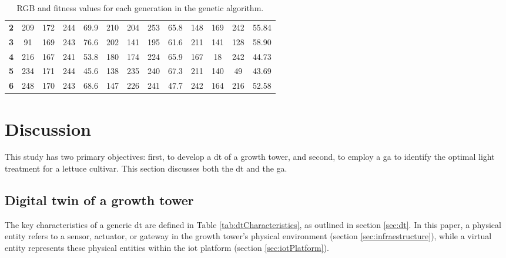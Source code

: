\documentclass[preprint, review, 12pt]{elsarticle}
\begin{document}
\begin{table}[htbp]
{\begin{tabular}{l|cccc|cccc|cccc|}
\multicolumn{1}{|l|}{\textbf{2}} & 209          & 172          & 244          & 69.9& 210          & 204          & 253          & 65.8                    & 148          & 169          & 242          & 55.84                    \\
\multicolumn{1}{|l|}{\textbf{3}} & 91           & 169          & 243          & 76.6& 202          & 141          & 195          & 61.6                    & 211          & 141          & 128          & 58.90                    \\
\multicolumn{1}{|l|}{\textbf{4}} & 216          & 167          & 241          & 53.8& 180          & 174          & 224          & 65.9                    & 167          & 18           & 242          & 44.73                    \\
\multicolumn{1}{|l|}{\textbf{5}} & 234          & 171          & 244          & 45.6& 138          & 235          & 240          & 67.3                    & 211          & 140          & 49           & 43.69                    \\
\multicolumn{1}{|l|}{\textbf{6}} & 248          & 170          & 243          & 68.6& 147          & 226          & 241          & 47.7                    & 242          & 164          & 216          & 52.58                    \\ \hline
\end{tabular}
}
\caption{RGB and fitness values for each generation in the genetic algorithm.}
\label{tab:results}
\end{table} 

\section{Discussion}

This study has two primary objectives: first, to develop a \gls{dt} of a growth tower, and second, to employ a \gls{ga} to identify the optimal light treatment for a lettuce cultivar. This section discusses both the \gls{dt} and the \gls{ga}.

\subsection{Digital twin of a growth tower}

The key characteristics of a generic \gls{dt} are defined in Table \ref{tab:dtCharacteristics}, as outlined in section \ref{sec:dt}. In this paper, a physical entity refers to a sensor, actuator, or gateway in the growth tower's physical environment (section \ref{sec:infraestructure}), while a virtual entity represents these physical entities within the \gls{iot} platform (section \ref{sec:iotPlatform}).
\end{document}
